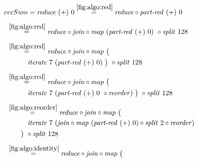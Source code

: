 \begin{figure*}[t]
\begin{align*}
  &\hspace{-1.5em}vecSum = \reduce\ (+)\ 0
%
  \overset{\ref{fig:algo:red}}{=\hspace{.2em}}
      \reduce \circ \partRed\ (+)\ 0\\[.5em]
%
  &\hspace{-2em}\quad\begin{aligned}
    &\overset{\ref{fig:algo:red}}{=\hspace{.2em}}
      \reduce \circ \join \circ \map\ (\partRed\ (+)\ 0)\ \circ \splitN\ 128
  \end{aligned}\\[.5em]
%
  &\hspace{-2em}\quad\begin{aligned}
    &\overset{\ref{fig:algo:red}}{=\hspace{.2em}}
      \reduce \circ \join \circ \map\ \big(\\
    &\qquad\quad\iterateN\ 7\ (\partRed\ (+)\ 0)\ \big)\ \circ \splitN\ 128
  \end{aligned}\\[.5em]
%
  &\hspace{-2em}\quad\begin{aligned}
    &\overset{\ref{fig:algo:red}}{=\hspace{.2em}}
      \reduce \circ \join \circ \map\ \big(\\
    &\qquad\quad\iterateN\ 7\ (\partRed\ (+)\ 0\ \circ \reorder)\ \big)\ \circ \splitN\ 128
  \end{aligned}\\[.5em]
%
  &\hspace{-2em}\quad\begin{aligned}
    &\overset{\ref{fig:algo:reorder}}{=\hspace{.2em}}
      \reduce \circ \join \circ \map\ \big(\\
    &\qquad\quad\iterateN\ 7\ (\join \circ \map\ (\partRed\ (+)\ 0) \circ \splitN\ 2\circ \reorder)\\
    &\qquad\big)\ \circ \splitN\ 128
  \end{aligned}\\[.5em]
%
  &\hspace{-2em}\quad\begin{aligned}
    &\overset{\ref{fig:algo:identity}}{=\hspace{.2em}}
      \reduce \circ \join \circ \map\ \big(\\

\end{aligned}
\end{align*}
\end{figure*}
